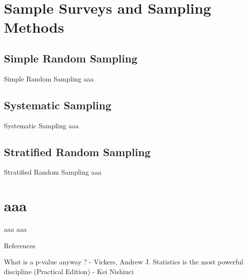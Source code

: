\documentclass[dvipdfmx, autodetect-engine, aspectratio=169, 10.5pt]{beamer}
\begin{document}
\section{Sample Surveys and Sampling Methods}

\subsection{Simple Random Sampling}

\begin{frame}{Simple Random Sampling}
	aaa
\end{frame}

\subsection{Systematic Sampling}

\begin{frame}{Systematic Sampling}
	aaa
\end{frame}

\subsection{Stratified Random Sampling}

\begin{frame}{Stratified Random Sampling}
	aaa
\end{frame}

\section{aaa}

\begin{frame}{aaa}
	aaa
\end{frame}


\begin{frame}[allowframebreaks]{References}
	\begin{thebibliography}{9}
		What is a p-value anyway $?$ - Vickers, Andrew J.
		Statistics is the most powerful discipline (Practical Edition) - Kei Nishiuci
	\end{thebibliography}
\end{frame}
\end{document}
